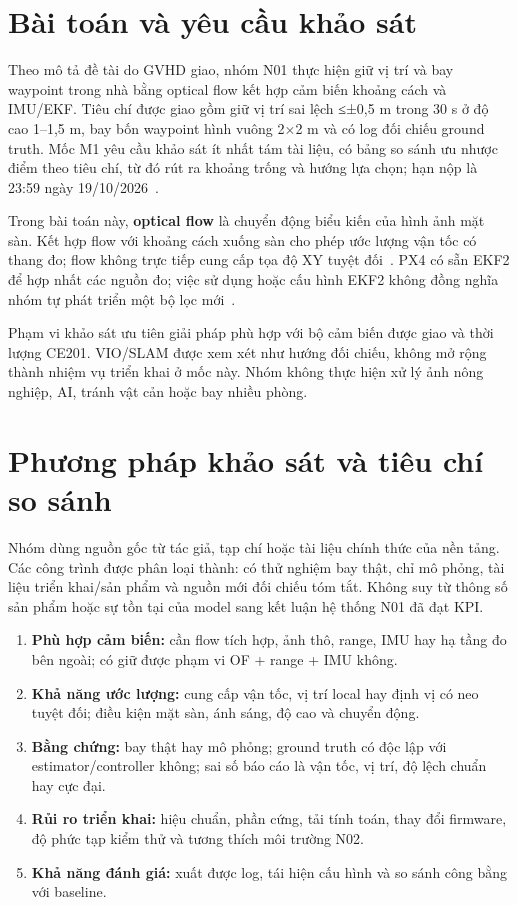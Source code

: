 \documentclass[a4paper,12pt]{article}
\begin{document}
\section{Bài toán và yêu cầu khảo sát}
Theo mô tả đề tài do GVHD giao, nhóm N01 thực hiện giữ vị trí và bay waypoint trong nhà bằng optical flow kết hợp cảm biến khoảng cách và IMU/EKF. Tiêu chí được giao gồm giữ vị trí sai lệch ≤±0,5 m trong 30 s ở độ cao 1--1,5 m, bay bốn waypoint hình vuông 2×2 m và có log đối chiếu ground truth. Mốc M1 yêu cầu khảo sát ít nhất tám tài liệu, có bảng so sánh ưu nhược điểm theo tiêu chí, từ đó rút ra khoảng trống và hướng lựa chọn; hạn nộp là 23:59 ngày 19/10/2026~\cite{source1}.

Trong bài toán này, \textbf{optical flow} là chuyển động biểu kiến của hình ảnh mặt sàn. Kết hợp flow với khoảng cách xuống sàn cho phép ước lượng vận tốc có thang đo; flow không trực tiếp cung cấp tọa độ XY tuyệt đối~\cite{source2}. PX4 có sẵn EKF2 để hợp nhất các nguồn đo; việc sử dụng hoặc cấu hình EKF2 không đồng nghĩa nhóm tự phát triển một bộ lọc mới~\cite{source3}.

Phạm vi khảo sát ưu tiên giải pháp phù hợp với bộ cảm biến được giao và thời lượng CE201. VIO/SLAM được xem xét như hướng đối chiếu, không mở rộng thành nhiệm vụ triển khai ở mốc này. Nhóm không thực hiện xử lý ảnh nông nghiệp, AI, tránh vật cản hoặc bay nhiều phòng.

\section{Phương pháp khảo sát và tiêu chí so sánh}
Nhóm dùng nguồn gốc từ tác giả, tạp chí hoặc tài liệu chính thức của nền tảng. Các công trình được phân loại thành: có thử nghiệm bay thật, chỉ mô phỏng, tài liệu triển khai/sản phẩm và nguồn mới đối chiếu tóm tắt. Không suy từ thông số sản phẩm hoặc sự tồn tại của model sang kết luận hệ thống N01 đã đạt KPI.

\begin{enumerate}
\item \textbf{Phù hợp cảm biến:} cần flow tích hợp, ảnh thô, range, IMU hay hạ tầng đo bên ngoài; có giữ được phạm vi OF + range + IMU không.
\item \textbf{Khả năng ước lượng:} cung cấp vận tốc, vị trí local hay định vị có neo tuyệt đối; điều kiện mặt sàn, ánh sáng, độ cao và chuyển động.
\item \textbf{Bằng chứng:} bay thật hay mô phỏng; ground truth có độc lập với estimator/controller không; sai số báo cáo là vận tốc, vị trí, độ lệch chuẩn hay cực đại.
\item \textbf{Rủi ro triển khai:} hiệu chuẩn, phần cứng, tải tính toán, thay đổi firmware, độ phức tạp kiểm thử và tương thích môi trường N02.
\item \textbf{Khả năng đánh giá:} xuất được log, tái hiện cấu hình và so sánh công bằng với baseline.
\end{enumerate}
\end{document}
